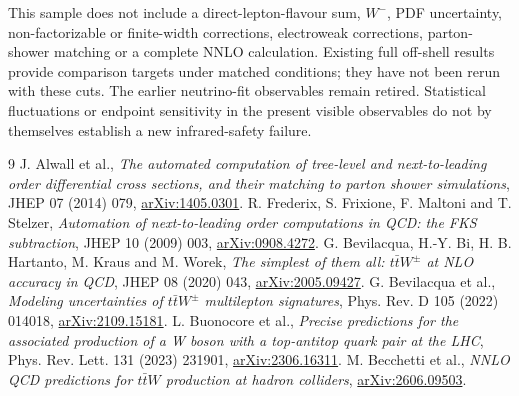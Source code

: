 \documentclass[11pt,a4paper]{article}
\begin{document}
This sample does not include a direct-lepton-flavour sum, $W^-$,
PDF uncertainty, non-factorizable or finite-width corrections,
electroweak corrections, parton-shower matching or a complete NNLO
calculation. Existing full off-shell results provide comparison targets
under matched conditions; they have not been rerun with these cuts.
The earlier neutrino-fit observables remain retired. Statistical
fluctuations or endpoint sensitivity in the present visible observables
do not by themselves establish a new infrared-safety failure.

\begin{thebibliography}{9}
 J. Alwall et al.,
\emph{The automated computation of tree-level and next-to-leading order
differential cross sections, and their matching to parton shower simulations},
JHEP 07 (2014) 079, \href{https://arxiv.org/abs/1405.0301}{arXiv:1405.0301}.
 R. Frederix, S. Frixione, F. Maltoni and T. Stelzer,
\emph{Automation of next-to-leading order computations in QCD: the FKS subtraction},
JHEP 10 (2009) 003, \href{https://arxiv.org/abs/0908.4272}{arXiv:0908.4272}.
 G. Bevilacqua, H.-Y. Bi, H. B. Hartanto, M. Kraus and M. Worek,
\emph{The simplest of them all: $t\bar tW^\pm$ at NLO accuracy in QCD},
JHEP 08 (2020) 043, \href{https://arxiv.org/abs/2005.09427}{arXiv:2005.09427}.
 G. Bevilacqua et al.,
\emph{Modeling uncertainties of $t\bar tW^\pm$ multilepton signatures},
Phys. Rev. D 105 (2022) 014018,
\href{https://arxiv.org/abs/2109.15181}{arXiv:2109.15181}.
 L. Buonocore et al.,
\emph{Precise predictions for the associated production of a W boson
with a top-antitop quark pair at the LHC},
Phys. Rev. Lett. 131 (2023) 231901,
\href{https://arxiv.org/abs/2306.16311}{arXiv:2306.16311}.
 M. Becchetti et al.,
\emph{NNLO QCD predictions for $t\bar tW$ production at hadron colliders},
\href{https://arxiv.org/abs/2606.09503}{arXiv:2606.09503}.
\end{thebibliography}
\end{document}
